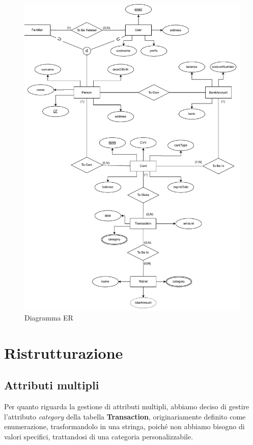 \begin{figure}[ht!]
    \centering
    \includegraphics[scale=0.7]{pdfs/ERdiagram.drawio.pdf}
    \caption{Diagramma ER}\label{ER}
\end{figure}

\newpage

\section{Ristrutturazione}

\subsection{Attributi multipli}

Per quanto riguarda la gestione di attributi multipli,
abbiamo deciso di gestire l'attributo \textit{category} della tabella
\textbf{Transaction}, originariamente definito come enumerazione,
trasformandolo in una stringa, poiché non abbiamo bisogno di valori
specifici, trattandosi di una categoria personalizzabile.

